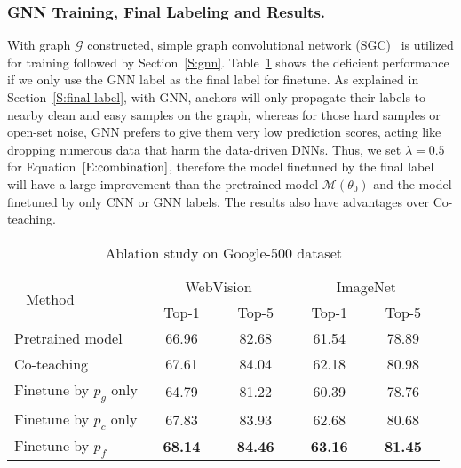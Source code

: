 \documentclass[sigconf]{acmart}
\begin{document}
\subsubsection{GNN Training, Final Labeling and Results.}
With graph $\mathcal{G}$ constructed, simple graph convolutional network (SGC)~\cite{wu2019simplifying} is utilized for training followed by Section~\ref{S:gnn}. Table~\ref{tab:google500} shows the deficient performance if we only use the GNN label as the final label for finetune. As explained in Section~\ref{S:final-label}, with GNN, anchors will only propagate their labels to nearby clean and easy samples on the graph, whereas for those hard samples or open-set noise, GNN prefers to give them very low prediction scores, acting like dropping numerous data that harm the data-driven DNNs. Thus, we set $\lambda=0.5$ for Equation~$\ref{E:combination}$, therefore the model finetuned by the final label will have a large improvement than the pretrained model $\mathcal{M}{(\theta_0)}$ and the model finetuned by only CNN or GNN labels. The results also have advantages over Co-teaching.

\setlength{\tabcolsep}{4pt}
\begin{table}
	\centering
	\caption{Ablation study on Google-500 dataset}
	\label{tab:google500}
	\begin{tabular}{lcccc}
		\toprule
		\multirow{2}{*}{~ Method}  & \multicolumn{2}{c}{ ~ WebVision ~ } & \multicolumn{2}{c}{ ~ ImageNet ~ } \\
		\multicolumn{1}{c}{} & \multicolumn{1}{c}{ ~ Top-1 ~ } & \multicolumn{1}{c}{ ~ Top-5 ~ } & \multicolumn{1}{c}{ ~ Top-1 ~ } & \multicolumn{1}{c}{ ~ Top-5 ~ } \\
		\midrule
		Pretrained model &66.96 &82.68&61.54 &78.89\\
		\midrule
		Co-teaching  & 67.61 & 84.04 & 62.18 & 80.98 \\
		\midrule
		Finetune by $p_g$ only &64.79&81.22	&60.39&78.76\\
		Finetune by $p_c$ only &67.83&83.93	&62.68&80.68\\
		Finetune by $p_f$      &\textbf{68.14}&\textbf{84.46}&\textbf{63.16}&\textbf{81.45}\\
		\bottomrule
	\end{tabular}
\end{table}
\end{document}
